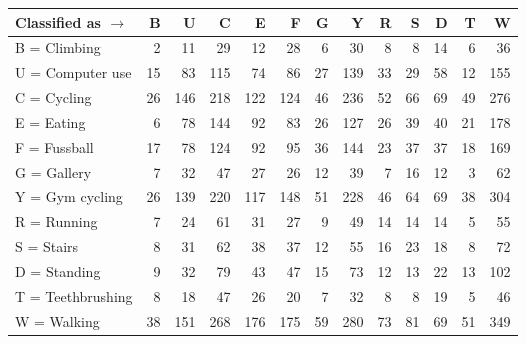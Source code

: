 \begin{tabular}{lrrrrrrrrrrrr}
\toprule
Classified as $\rightarrow$ &   B &    U &    C &    E &    F &   G &    Y &   R &   S &   D &   T &    W \\
\midrule
B = Climbing      &   2 &   11 &   29 &   12 &   28 &   6 &   30 &   8 &   8 &  14 &   6 &   36 \\
U = Computer use  &  15 &   83 &  115 &   74 &   86 &  27 &  139 &  33 &  29 &  58 &  12 &  155 \\
C = Cycling       &  26 &  146 &  218 &  122 &  124 &  46 &  236 &  52 &  66 &  69 &  49 &  276 \\
E = Eating        &   6 &   78 &  144 &   92 &   83 &  26 &  127 &  26 &  39 &  40 &  21 &  178 \\
F = Fussball      &  17 &   78 &  124 &   92 &   95 &  36 &  144 &  23 &  37 &  37 &  18 &  169 \\
G = Gallery       &   7 &   32 &   47 &   27 &   26 &  12 &   39 &   7 &  16 &  12 &   3 &   62 \\
Y = Gym cycling   &  26 &  139 &  220 &  117 &  148 &  51 &  228 &  46 &  64 &  69 &  38 &  304 \\
R = Running       &   7 &   24 &   61 &   31 &   27 &   9 &   49 &  14 &  14 &  14 &   5 &   55 \\
S = Stairs        &   8 &   31 &   62 &   38 &   37 &  12 &   55 &  16 &  23 &  18 &   8 &   72 \\
D = Standing      &   9 &   32 &   79 &   43 &   47 &  15 &   73 &  12 &  13 &  22 &  13 &  102 \\
T = Teethbrushing &   8 &   18 &   47 &   26 &   20 &   7 &   32 &   8 &   8 &  19 &   5 &   46 \\
W = Walking       &  38 &  151 &  268 &  176 &  175 &  59 &  280 &  73 &  81 &  69 &  51 &  349 \\
\bottomrule
\end{tabular}
